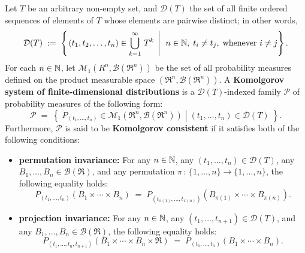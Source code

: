 \begin{definition}
\mbox{}\vskip 0cm
\noindent
Let $T$ be an arbitrary non-empty set, and
$\mathcal{D}(T)$ the set of all finite ordered sequences of elements of $T$ whose elements are pairwise distinct;
in other words,
\begin{equation*}
\mathcal{D}(T)
\; := \;
\left\{
\left. (t_{1},t_{2},\ldots,t_{n}) \in \bigcup_{k=1}^{\infty}\,T^{k} \;\,\right\vert\;\,
n \in \mathbb{N}, \; t_{i} \neq t_{j}, \;\textnormal{whenever $i \neq j$}
\right\}.
\end{equation*}
For each $n \in \mathbb{N}$, let $\mathcal{M}_{1}\!\left(R^{n},\mathcal{B}(\Re^{n})\right)$
be the set of all probability measures defined on the product measurable space
$\left(\Re^{n},\mathcal{B}(\Re^{n})\right)$.
A \textbf{Komolgorov system of finite-dimensional distributions} is a $\mathcal{D}(T)$-indexed family $\mathcal{P}$
of probability measures of the following form:
\begin{equation*}
\mathcal{P}
\; = \;
\left\{\;\left.
P_{(t_{1},\ldots,t_{n})} \in \mathcal{M}_{1}\!\left(\Re^{n},\mathcal{B}(\Re^{n})\right)
\;\right\vert\;
(t_{1},\ldots,t_{n}) \in \mathcal{D}(T)
\;\right\}.
\end{equation*}
Furthermore, $\mathcal{P}$ is said to be \textbf{Komolgorov consistent}
if it satisfies both of the following conditions:
\begin{itemize}
\item
\textbf{permutation invariance:}\;
For any $n \in \mathbb{N}$, any $\left(t_{1},\ldots,t_{n}\right)\in \mathcal{D}(T)$,
any $B_{1},\ldots,B_{n}\in\mathcal{B}(\Re)$,
and any permutation $\pi\,:\,\{1,\ldots,n\}\longrightarrow\{1,\ldots,n\}$,
the following equality holds:
\begin{equation*}
P_{(t_{1},\ldots,t_{n})}\!\left(B_{1} \times \cdots \times B_{n}\right)
\;=\;
P_{(t_{\pi(1)},\ldots,t_{\pi(n)})}\!\left(B_{\pi(1)} \times \cdots \times B_{\pi(n)}\right).
\end{equation*}
\item
\textbf{projection invariance:}\;
For any $n \in \mathbb{N}$, any $\left(t_{1},\ldots,t_{n+1}\right)\in \mathcal{D}(T)$,
and any $B_{1},\ldots,B_{n}\in\mathcal{B}(\Re)$,
the following equality holds:
\begin{equation*}
P_{(t_{1},\ldots,t_{n},t_{n+1})}\!\left(B_{1} \times \cdots \times B_{n} \times \Re \right)
\;=\;
P_{(t_{1},\ldots,t_{n})}\!\left(B_{1} \times \cdots \times B_{n}\right).
\end{equation*}
\end{itemize}
\end{definition}

